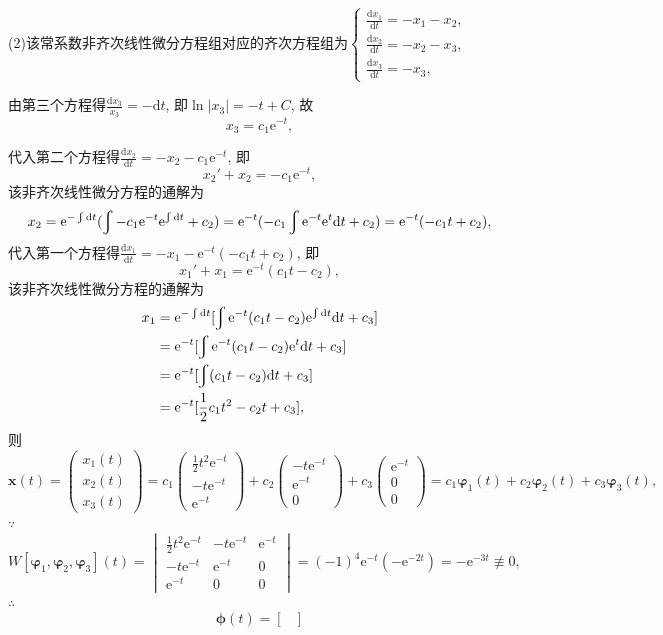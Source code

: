 \documentclass[12pt,UTF8]{ctexart}
\newcommand{\md}[1]{\mathrm d#1}
\newcommand{\me}[0]{\mathrm e}
\newcommand{\dd}[2]{\frac{\mathrm d #1}{\mathrm d #2}}
\begin{document}
\begin{enumerate}
(2)该常系数非齐次线性微分方程组对应的齐次方程组为$\begin{cases}
\dd{x_1}t=-x_1-x_2,\\
\dd{x_2}t=-x_2-x_3,\\
\dd{x_3}t=-x_3,
\end{cases}$

由第三个方程得$\frac{\md x_3}{x_3}=-\md t$, 即$\ln|x_3|=-t+C$, 故\[x_3=c_1\me^{-t},\] 

代入第二个方程得$\dd{x_2}t=-x_2-c_1\me^{-t}$, 即
\[x_2'+x_2=-c_1\me^{-t},\]
该非齐次线性微分方程的通解为
\[x_2=\me^{-\varint\md t}(\varint-c_1\me^{-t}\me^{\varint\md t}+c_2)=\me^{-t}(-c_1\varint\me^{-t}\me^t\md t+c_2)=\me^{-t}(-c_1t+c_2),\]
代入第一个方程得$\dd{x_1}t=-x_1-\me^{-t}(-c_1t+c_2)$, 即
\[x_1'+x_1=\me^{-t}(c_1t-c_2),\]
该非齐次线性微分方程的通解为
\[\begin{aligned}
x_1&=\me^{-\varint\md t}[\varint\me^{-t}(c_1t-c_2)\me^{\varint\md t}\md t+c_3]\\
&=\me^{-t}[\varint\me^{-t}(c_1t-c_2)\me^t\md t+c_3]\\
&=\me^{-t}[\varint(c_1t-c_2)\md t+c_3]\\
&=\me^{-t}[\frac12c_1t^2-c_2t+c_3],
\end{aligned}\]
则
\[\bm x(t)=\begin{pmatrix}x_1(t)\\x_2(t)\\x_3(t)\end{pmatrix}=c_1\begin{pmatrix}\frac12t^2\me^{-t}\\-t\me^{-t}\\\me^{-t}\end{pmatrix}+c_2\begin{pmatrix}-t\me^{-t}\\\me^{-t}\\0\end{pmatrix}+c_3\begin{pmatrix}\me^{-t}\\0\\0\end{pmatrix}=c_1\bm\varphi_1(t)+c_2\bm\varphi_2(t)+c_3\bm\varphi_3(t),\]
$\because$
\[W[\bm\varphi_1,\bm\varphi_2,\bm\varphi_3](t)=\begin{vmatrix}
\frac12t^2\me^{-t}&-t\me^{-t}&\me^{-t}\\-t\me^{-t}&\me^{-t}&0\\\me^{-t}&0&0
\end{vmatrix}=(-1)^4\me^{-t}(-\me^{-2t})=-\me^{-3t}\not\equiv0,\]
$\therefore$
\[\bm\phi(t)=\begin{bmatrix}

\end{bmatrix}\]
\end{enumerate}
\end{document}
